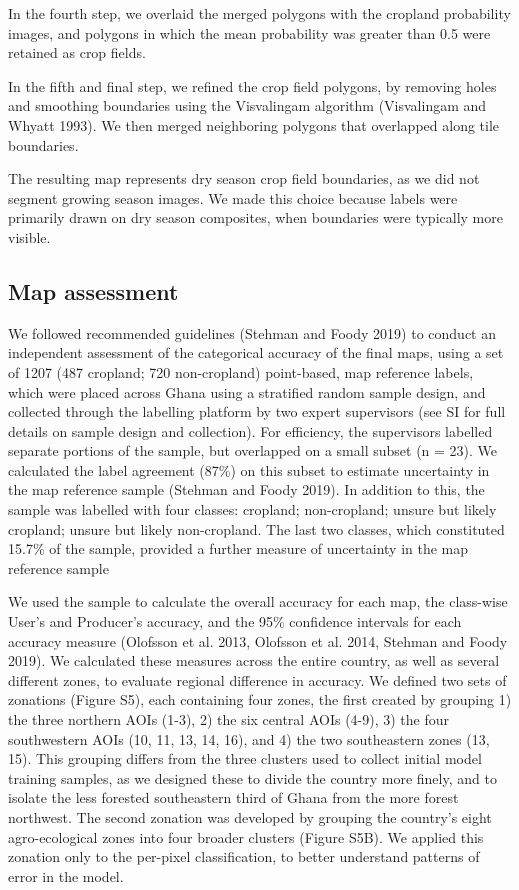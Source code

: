 \documentclass[11pt,a4paper]{article}
\begin{document}
In the fourth step, we overlaid the merged polygons with the cropland
probability images, and polygons in which the mean probability was
greater than 0.5 were retained as crop fields.

In the fifth and final step, we refined the crop field polygons, by
removing holes and smoothing boundaries using the Visvalingam algorithm
(Visvalingam and Whyatt 1993). We then merged neighboring polygons that
overlapped along tile boundaries.

The resulting map represents dry season crop field boundaries, as we did
not segment growing season images. We made this choice because labels
were primarily drawn on dry season composites, when boundaries were
typically more visible.

\hypertarget{map-assessment}{%
\subsection{Map assessment}\label{map-assessment}}

We followed recommended guidelines (Stehman and Foody 2019) to conduct
an independent assessment of the categorical accuracy of the final maps,
using a set of 1207 (487 cropland; 720 non-cropland) point-based, map
reference labels, which were placed across Ghana using a stratified
random sample design, and collected through the labelling platform by
two expert supervisors (see SI for full details on sample design and
collection). For efficiency, the supervisors labelled separate portions
of the sample, but overlapped on a small subset (n = 23). We calculated
the label agreement (87\%) on this subset to estimate uncertainty in the
map reference sample (Stehman and Foody 2019). In addition to this, the
sample was labelled with four classes: cropland; non-cropland; unsure
but likely cropland; unsure but likely non-cropland. The last two
classes, which constituted 15.7\% of the sample, provided a further
measure of uncertainty in the map reference sample

We used the sample to calculate the overall accuracy for each map, the
class-wise User's and Producer's accuracy, and the 95\% confidence
intervals for each accuracy measure (Olofsson et al. 2013, Olofsson et
al. 2014, Stehman and Foody 2019). We calculated these measures across
the entire country, as well as several different zones, to evaluate
regional difference in accuracy. We defined two sets of zonations
(Figure S5), each containing four zones, the first created by grouping
1) the three northern AOIs (1-3), 2) the six central AOIs (4-9), 3) the
four southwestern AOIs (10, 11, 13, 14, 16), and 4) the two southeastern
zones (13, 15). This grouping differs from the three clusters used to
collect initial model training samples, as we designed these to divide
the country more finely, and to isolate the less forested southeastern
third of Ghana from the more forest northwest. The second zonation was
developed by grouping the country's eight agro-ecological zones into
four broader clusters (Figure S5B). We applied this zonation only to the
per-pixel classification, to better understand patterns of error in the
model.
\end{document}
